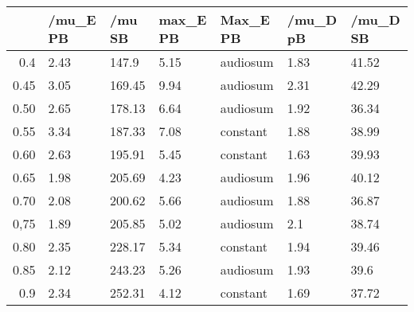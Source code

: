\begin{table}[ht]
\centering
\begin{tabular}{rllllll}
  \hline
 & /mu\_E PB & /mu SB & max\_E PB & Max\_E PB & /mu\_D pB & /mu\_D SB \\ 
  \hline
0.4 & 2.43 & 147.9 & 5.15 & audiosum & 1.83 & 41.52 \\ 
  0.45 & 3.05 & 169.45 & 9.94 & audiosum & 2.31 & 42.29 \\ 
  0.50 & 2.65 & 178.13 & 6.64 & audiosum & 1.92 & 36.34 \\ 
  0.55 & 3.34 & 187.33 & 7.08 & constant & 1.88 & 38.99 \\ 
  0.60 & 2.63 & 195.91 & 5.45 & constant & 1.63 & 39.93 \\ 
  0.65 & 1.98 & 205.69 & 4.23 & audiosum & 1.96 & 40.12 \\ 
  0.70 & 2.08 & 200.62 & 5.66 & audiosum & 1.88 & 36.87 \\ 
  0,75 & 1.89 & 205.85 & 5.02 & audiosum & 2.1 & 38.74 \\ 
  0.80 & 2.35 & 228.17 & 5.34 & constant & 1.94 & 39.46 \\ 
  0.85 & 2.12 & 243.23 & 5.26 & audiosum & 1.93 & 39.6 \\ 
  0.9 & 2.34 & 252.31 & 4.12 & constant & 1.69 & 37.72 \\ 
   \hline
\end{tabular}
\end{table}
